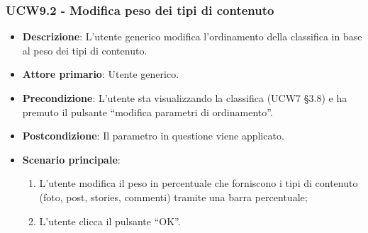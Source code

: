 \subsubsection{UCW9.2 - Modifica peso dei tipi di contenuto}
\begin{itemize}
	\item \textbf{Descrizione}: L'utente generico modifica l'ordinamento della classifica in base al peso dei tipi di contenuto.
    \item \textbf{Attore primario}: Utente generico.
    \item \textbf{Precondizione}: L’utente sta visualizzando la classifica (UCW7 §3.8) e ha premuto il pulsante “modifica parametri di ordinamento”.
    \item \textbf{Postcondizione}: Il parametro in questione viene applicato.
    \item \textbf{Scenario principale}: 
    \begin{enumerate}
        \item L’utente modifica il peso in percentuale che forniscono i tipi di contenuto (foto, post, stories, commenti) tramite una barra percentuale;
        \item L’utente clicca il pulsante “OK”.
    \end{enumerate}
\end{itemize}

\pagebreak
